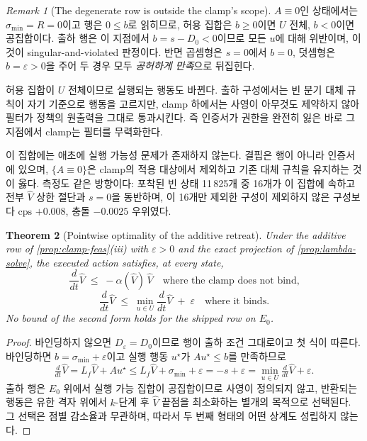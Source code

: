 \documentclass[11pt]{article}
\theoremstyle{plain}
\newtheorem{theorem}{Theorem}[section]
\theoremstyle{definition}
\theoremstyle{remark}
\newtheorem{remark}[theorem]{Remark}
\newcommand{\Vhat}{\widehat V}
\newcommand{\Lf}{L_f}
\begin{document}
\begin{remark}[The degenerate row is outside the clamp's scope]\label{rem:clamp-degenerate}
$A \equiv 0$인 상태에서는 $\sigma_{\min} = R = 0$이고 행은 $0 \le b$로 읽히므로,
허용 집합은 $b \ge 0$이면 $U$ 전체, $b < 0$이면 공집합이다. 출하 행은 이 지점에서
$b = s - D_0 < 0$이므로 모든 $u$에 대해 위반이며, 이것이 singular-and-violated
판정이다. 반면 곱셈형은 $s = 0$에서 $b = 0$, 덧셈형은
$b = \varepsilon > 0$을 주어 두 경우 모두 \emph{공허하게 만족}으로 뒤집힌다.

허용 집합이 $U$ 전체이므로 실행되는 행동도 바뀐다. 출하 구성에서는 빈 분기
대체 규칙이 자기 기준으로 행동을 고르지만, clamp 하에서는 사영이 아무것도
제약하지 않아 필터가 정책의 원출력을 그대로 통과시킨다. 즉 인증서가 권한을
완전히 잃은 바로 그 지점에서 clamp는 필터를 무력화한다.

이 집합에는 애초에 실행 가능성 문제가 존재하지 않는다. 결핍은 행이 아니라
인증서에 있으며, $\{A \equiv 0\}$은 clamp의 적용 대상에서 제외하고 기존 대체
규칙을 유지하는 것이 옳다. 측정도 같은 방향이다: 포착된 빈 상태 11\,825개 중
16개가 이 집합에 속하고 전부 $\Vhat$ 상한 절단과 $s = 0$을 동반하며, 이 16개만
제외한 구성이 제외하지 않은 구성보다 $\mathrm{cps}$ $+0.008$, 충돌 $-0.0025$
우위였다.
\end{remark}

\begin{theorem}[Pointwise optimality of the additive retreat]\label{thm:eps-optimal}
Under the additive row of \cref{prop:clamp-feas}(iii) with $\varepsilon > 0$ and the
exact projection of \cref{prop:lambda-solve}, the executed action satisfies, at every
state,
\[
\frac{d}{dt}\Vhat \;\le\; -\alpha(\Vhat)\,\Vhat
\quad\text{where the clamp does not bind,}
\]
\[
\frac{d}{dt}\Vhat \;\le\; \min_{u \in U} \frac{d}{dt}\Vhat \;+\; \varepsilon
\quad\text{where it binds.}
\]
No bound of the second form holds for the shipped row on $E_0$.
\end{theorem}
\begin{proof}
바인딩하지 않으면 $D_\varepsilon = D_0$이므로 행이 출하 조건 그대로이고 첫 식이
따른다. 바인딩하면 $b = \sigma_{\min} + \varepsilon$이고 실행 행동 $u^\star$가
$A u^\star \le b$를 만족하므로
\[
\tfrac{d}{dt}\Vhat = \Lf\Vhat + Au^\star \le \Lf\Vhat + \sigma_{\min} + \varepsilon
= -s + \varepsilon = \min_{u\in U}\tfrac{d}{dt}\Vhat + \varepsilon .
\]
출하 행은 $E_0$ 위에서 실행 가능 집합이 공집합이므로 사영이 정의되지 않고,
반환되는 행동은 유한 격자 위에서 $k$-단계 후 $\Vhat$ 끝점을 최소화하는 별개의
목적으로 선택된다. 그 선택은 점별 감소율과 무관하며, 따라서 두 번째 형태의
어떤 상계도 성립하지 않는다.
\end{proof}
\end{document}
